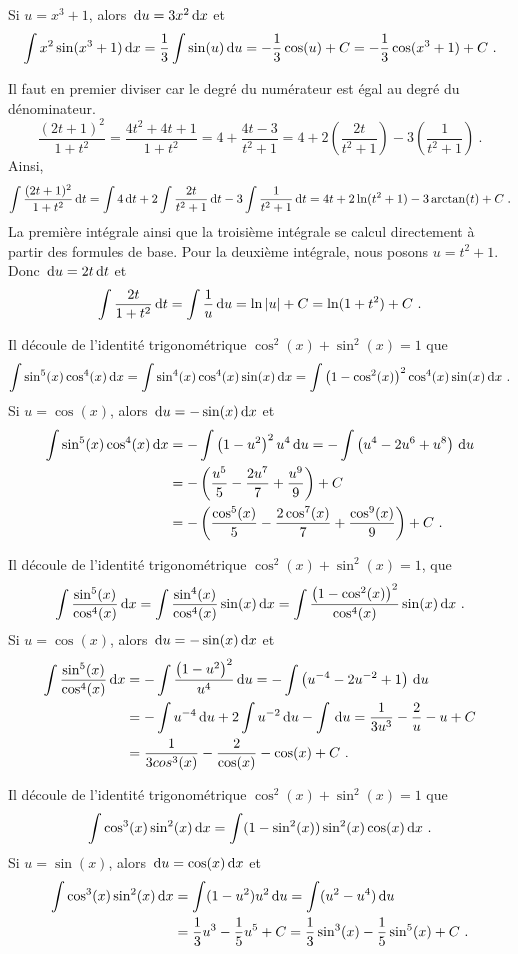 { Si $u=x^3+1$, alors $\,\mathrm{d}u = 3 x^2 \,\mathrm{d}x$ et
\[
\int x^2\sin(x^3+1) \dx{x}
= \frac{1}{3} \int \sin(u) \dx{u}
= -\frac{1}{3} \cos(u) + C = -\frac{1}{3} \cos(x^3+1) + C \ .
\]

 Il faut en premier diviser car le degré du numérateur
est égal au degré du dénominateur.
\[
\frac{(2t+1)^2}{1+t^2}
= \frac{4t^2+4t+1}{1+t^2}
= 4 + \frac{4t-3}{t^2+1}
= 4 + 2 \left(\frac{2t}{t^2+1}\right) -3 \left(\frac{1}{t^2+1}\right) \ .
\]
Ainsi,
\[
\int \frac{(2t+1)^2}{1+t^2}\,\mathrm{d}t
= \int 4 \,\mathrm{d}t + 2 \int \frac{2t}{t^2+1} \,\mathrm{d}t
-3 \int \frac{1}{t^2+1} \,\mathrm{d}t
= 4 t +2 \ln(t^2+1) -3 \arctan(t) + C \; .
\]
La première intégrale ainsi que la troisième intégrale se calcul
directement à partir des formules de base.  Pour la deuxième
intégrale, nous posons $u=t^2+1$.  Donc $\,\mathrm{d}u = 2t \,\mathrm{d}t$ et
\[
\int \frac{2t}{1+t^2}\,\mathrm{d}t = \int \frac{1}{u}\,\mathrm{d}u
= \ln|u| + C = \ln(1+t^2) + C \ .
\]

 Il découle de l'identité trigonométrique $\cos^2(x) + \sin^2(x) = 1$
que
\[
\int \sin^5(x) \cos^4(x) \,\mathrm{d}x = \int \sin^4(x) \cos^4(x) \sin(x) \,\mathrm{d}x 
= \int \left(1- \cos^2(x)\right)^2 \cos^4(x) \sin(x) \,\mathrm{d}x \ .
\]
Si $u = \cos(x)$, alors $\,\mathrm{d}u = -\sin(x) \,\mathrm{d}x$ et
\begin{align*}
\int \sin^5(x) \cos^4(x) \,\mathrm{d}x &= - \int \left(1- u^2\right)^2 u^4 \,\mathrm{d}u
= -\int \left( u^4 - 2 u^6 + u^8\right) \,\mathrm{d}u \\
&= -\left( \frac{u^5}{5} - \frac{2 u^7}{7} + \frac{u^9}{9}\right) + C \\
&= -\left( \frac{\cos^5(x)}{5} - \frac{2 \cos^7(x)}{7}
+ \frac{\cos^9(x)}{9}\right) + C \ .
\end{align*}

 Il découle de  l'identité trigonométrique $\cos^2(x) + \sin^2(x) = 1$,
que
\[
\int \frac{\sin^5(x)}{\cos^4(x)} \dx{x}
= \int \frac{\sin^4(x)}{\cos^4(x)} \sin(x) \dx{x}
= \int \frac{\left(1-\cos^2(x)\right)^2}{\cos^4(x)} \sin(x) \dx{x} \ .
\]
Si $u = \cos(x)$, alors $\,\mathrm{d}u = -\sin(x) \,\mathrm{d}x$ et
\begin{align*}
\int \frac{\sin^5(x)}{\cos^4(x)} \,\mathrm{d}x &
= - \int \frac{\left(1-u^2\right)^2}{u^4} \,\mathrm{d}u
= - \int \left( u^{-4} - 2 u^{-2} + 1 \right) \,\mathrm{d}u \\
&= - \int  u^{-4}\,\mathrm{d}u +2 \int u^{-2}\,\mathrm{d}u - \int \,\mathrm{d}u
= \frac{1}{3 u^3} - \frac{2}{u} - u  + C \\
&=  \frac{1}{3 cos^3(x)} - \frac{2}{\cos(x)} - \cos(x) + C \ .
\end{align*}

 Il découle de l'identité trigonométrique $\cos^2(x) + \sin^2(x) = 1$
que
\[
  \int \cos^3(x) \sin^2(x) \,\mathrm{d}x=
  \int (1 - \sin^2(x)) \sin^2(x) \cos(x) \,\mathrm{d}x \ .
\]
Si $u = \sin(x)$, alors $\,\mathrm{d}u = \cos(x) \,\mathrm{d}x$ et
\begin{align*}
  \int \cos^3(x) \sin^2(x) \,\mathrm{d}x &=
 \int ( 1- u^2) u^2 \,\mathrm{d}u = \int ( u^2 - u^4) \,\mathrm{d}u \\
 &= \frac{1}{3} u^3 - \frac{1}{5} u^5 + C 
   = \frac{1}{3} \sin^3(x) - \frac{1}{5} \sin^5(x) + C \ .
\end{align*}
}


